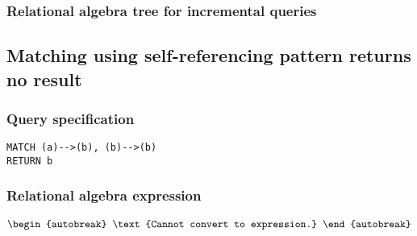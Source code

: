 \subsubsection*{Relational algebra tree for incremental queries}


\subsection{Matching using self-referencing pattern returns no result}

\subsubsection*{Query specification}

\begin{lstlisting}
MATCH (a)-->(b), (b)-->(b)
RETURN b
\end{lstlisting}

\subsubsection*{Relational algebra expression}

\begin{align*}
\begin{autobreak}
\text{Cannot convert to expression.}
\end{autobreak}
\end{align*}

